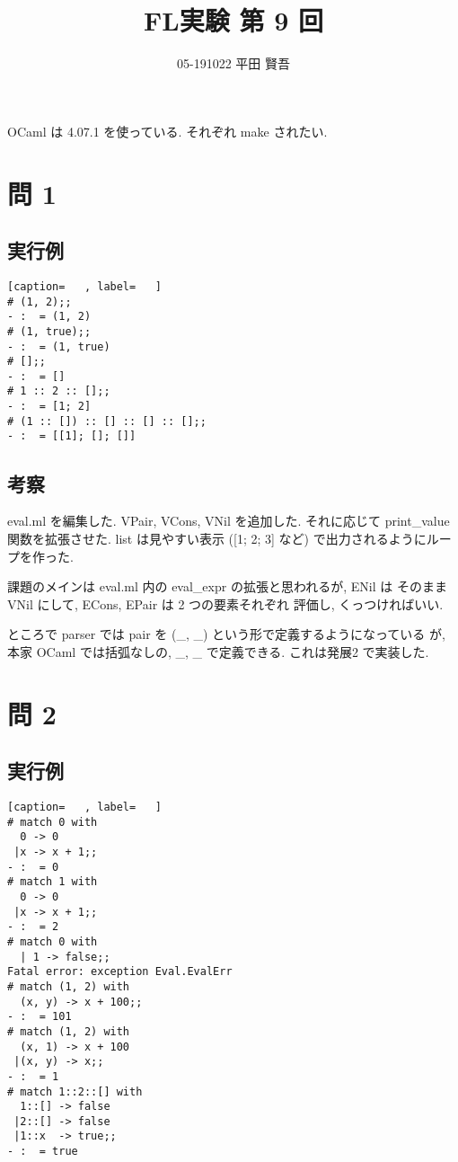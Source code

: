 \documentclass[dvipdfmx]{jsarticle}
\begin{document}
\title {FL実験 第 9 回}
\author{05-191022 平田 賢吾}
\maketitle

\noindent
OCaml は 4.07.1 を使っている.
それぞれ make されたい.

\section*{問 1}
\subsection*{実行例}
\begin{lstlisting}[caption=   , label=   ]
# (1, 2);;
- :  = (1, 2)
# (1, true);;
- :  = (1, true)
# [];;
- :  = []
# 1 :: 2 :: [];;
- :  = [1; 2]
# (1 :: []) :: [] :: [] :: [];;
- :  = [[1]; []; []]
\end{lstlisting}
\subsection*{考察}
eval.ml を編集した.
VPair, VCons, VNil を追加した. それに応じて print\_value 関数を拡張させた.
list は見やすい表示 ([1; 2; 3] など) で出力されるようにループを作った.

課題のメインは
eval.ml 内の eval\_expr
の拡張と思われるが,
ENil は そのまま VNil にして, ECons, EPair は 2 つの要素それぞれ
評価し, くっつければいい.

ところで parser では pair を (\_, \_) という形で定義するようになっている
が, 本家 OCaml では括弧なしの, \_, \_ で定義できる.
これは発展2 で実装した.


\newpage
\section*{問 2}
\subsection*{実行例}
\begin{lstlisting}[caption=   , label=   ]
# match 0 with
  0 -> 0
 |x -> x + 1;;
- :  = 0
# match 1 with
  0 -> 0
 |x -> x + 1;;
- :  = 2
# match 0 with
  | 1 -> false;;
Fatal error: exception Eval.EvalErr
# match (1, 2) with
  (x, y) -> x + 100;;
- :  = 101
# match (1, 2) with
  (x, 1) -> x + 100
 |(x, y) -> x;;
- :  = 1
# match 1::2::[] with
  1::[] -> false
 |2::[] -> false
 |1::x  -> true;;
- :  = true
\end{lstlisting}
\end{document}

